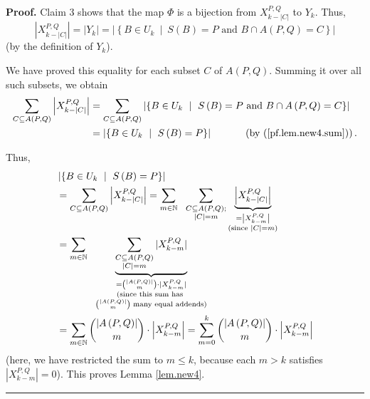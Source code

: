 \documentclass[numbers=enddot,12pt,final,onecolumn,notitlepage]{scrartcl}%
\theoremstyle{definition}
\newenvironment{proof}[1][Proof]{\noindent\textbf{#1.} }{\ \rule{0.5em}{0.5em}}
\let\sumnonlimits\sum
\renewcommand{\sum}{\sumnonlimits\limits}
\theoremstyle{plainsl}
\begin{document}
\begin{proof}
Claim 3 shows that the map $\Phi$ is a bijection from $X_{k-|C|}^{P,Q}$ to
$Y_{k}$. Thus,%
\[
\left\vert X_{k-|C|}^{P,Q}\right\vert =\left\vert Y_{k}\right\vert =\left\vert
\left\{  B\in U_{k}\ \mid\ S\left(  B\right)  =P\text{ and }B\cap A\left(
P,Q\right)  =C\right\}  \right\vert
\]
(by the definition of $Y_{k}$).

We have proved this equality for each subset $C$ of $A\left(  P,Q\right)  $.
Summing it over all such subsets, we obtain%
\begin{align*}
\sum_{C\subseteq A\left(  P,Q\right)  }\left\vert X_{k-|C|}^{P,Q}\right\vert
&  =\sum_{C\subseteq A\left(  P,Q\right)  }\left\vert \left\{  B\in
U_{k}\ \mid\ S\left(  B\right)  =P\text{ and }B\cap A\left(  P,Q\right)
=C\right\}  \right\vert \\
&  =\left\vert \left\{  B\in U_{k}\ \mid\ S\left(  B\right)  =P\right\}
\right\vert \ \ \ \ \ \ \ \ \ \ \left(  \text{by (\ref{pf.lem.new4.sum}%
)}\right)  .
\end{align*}

Thus, \begin{align*}
&  \left\vert \left\{  B\in U_{k}\ \mid\ S\left(  B\right)  =P\right\}
\right\vert \\
&  =\sum_{C\subseteq A\left(  P,Q\right)  }\left\vert X_{k-|C|}^{P,Q}%
\right\vert =\sum_{m\in\mathbb{N}}\ \ \sum_{\substack{C\subseteq A\left(
P,Q\right)  ;\\\left\vert C\right\vert =m}}\underbrace{\left\vert
X_{k-|C|}^{P,Q}\right\vert }_{\substack{=\left\vert X_{k-m}^{P,Q}\right\vert
\\\text{(since }\left\vert C\right\vert =m\text{)}}}\\
&= \sum_{m\in\mathbb{N}}\ \ 
\underbrace{
  \sum_{\substack{C\subseteq A(P,Q) \\ |C| = m}} |X_{k-m}^{P,Q}|
}_{
  \substack{
    ={\scriptstyle \binom{|A(P,Q)|}{m}} \cdot |X_{k-m}^{P,Q}| \\
    \text{(since this sum has } \\
    {\scriptstyle \binom{|A(P,Q)|}{m}} \text{ many equal addends)}
  }
} \\
&= \sum_{m\in\mathbb{N}}\dbinom{\left\vert A\left(  P,Q\right)
\right\vert }{m}\cdot\left\vert X_{k-m}^{P,Q}\right\vert  =\sum_{m=0}^{k}\dbinom{\left\vert A\left(  P,Q\right)  \right\vert }%
{m}\cdot\left\vert X_{k-m}^{P,Q}\right\vert
\end{align*}
(here, we have restricted the sum to $m\leq k$, because each $m>k$ satisfies
$\left\vert X_{k-m}^{P,Q}\right\vert =0$). This proves Lemma \ref{lem.new4}.
\end{proof}
\end{document}
